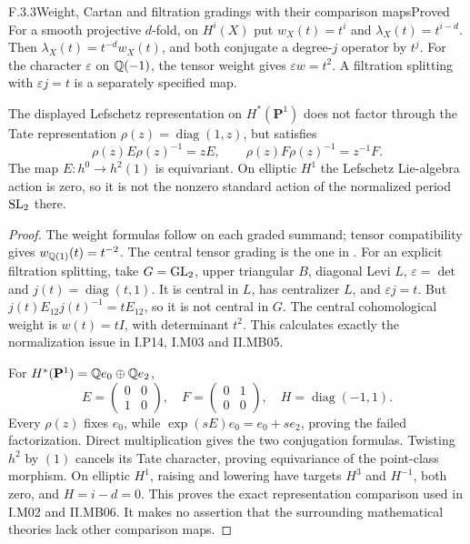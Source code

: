 \begin{result}{F.3.3}{Weight, Cartan and filtration gradings with their comparison maps}{Proved}
For a smooth projective $d$-fold, on $H^i(X)$ put $w_X(t)=t^i$ and $\lambda_X(t)=t^{i-d}$. Then $\lambda_X(t)=t^{-d}w_X(t)$, and both conjugate a degree-$j$ operator by $t^j$. For the character $\varepsilon$ on $\mathbb Q(-1)$, the tensor weight gives $\varepsilon w=t^2$. A filtration splitting with $\varepsilon j=t$ is a separately specified map.

The displayed Lefschetz representation on $H^*(\mathbf P^1)$ does not factor through the Tate representation $\rho(z)=\operatorname{diag}(1,z)$, but satisfies
\[
 \rho(z)E\rho(z)^{-1}=zE,\qquad
 \rho(z)F\rho(z)^{-1}=z^{-1}F.
\]
The map $E:h^0\to h^2(1)$ is equivariant. On elliptic $H^1$ the Lefschetz Lie-algebra action is zero, so it is not the nonzero standard action of the normalized period $\operatorname{SL}_2$ there.
\end{result}
\begin{proof}
The weight formulas follow on each graded summand; tensor compatibility gives $w_{\mathbb Q(1)}(t)=t^{-2}$. The central tensor grading is the one in \cite[Definition 5.1]{DM1982}. For an explicit filtration splitting, take $G=\operatorname{GL}_2$, upper triangular $B$, diagonal Levi $L$, $\varepsilon=\det$ and $j(t)=\operatorname{diag}(t,1)$. It is central in $L$, has centralizer $L$, and $\varepsilon j=t$. But $j(t)E_{12}j(t)^{-1}=tE_{12}$, so it is not central in $G$. The central cohomological weight is $w(t)=tI$, with determinant $t^2$. This calculates exactly the normalization issue in I.P14, I.M03 and II.MB05.

For $H^*(\mathbf P^1)=\mathbb Q e_0\oplus\mathbb Q e_2$,
\[
 E=\begin{pmatrix}0&0\\1&0\end{pmatrix},\quad
 F=\begin{pmatrix}0&1\\0&0\end{pmatrix},\quad
 H=\operatorname{diag}(-1,1).
\]
Every $\rho(z)$ fixes $e_0$, while $\exp(sE)e_0=e_0+se_2$, proving the failed factorization. Direct multiplication gives the two conjugation formulas. Twisting $h^2$ by $(1)$ cancels its Tate character, proving equivariance of the point-class morphism. On elliptic $H^1$, raising and lowering have targets $H^3$ and $H^{-1}$, both zero, and $H=i-d=0$. This proves the exact representation comparison used in I.M02 and II.MB06. It makes no assertion that the surrounding mathematical theories lack other comparison maps.
\end{proof}

